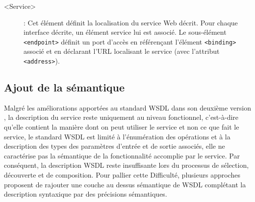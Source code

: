 \begin{description}
	    \item[<Service>]:
		Cet élément définit la localisation du service Web décrit. Pour chaque
		interface décrite, un élément service lui est associé. Le sous-élément \texttt{<endpoint>} définit un
		port d’accès en référençant l’élément \texttt{<binding>} associé et en déclarant l'\textsc{URL} 
		localisant le service (avec l’attribut \texttt{<address>}). 	    	



	\end{description}

        \subsection{Ajout de la sémantique}
	    Malgré les améliorations apportées au standard \textsc{WSDL} dans son deuxième version
	    \cite{chinnici2007web}, la description du service reste uniquement au niveau fonctionnel, 
	    c'est-à-dire qu'elle contient la manière dont on peut utiliser le service et non ce
	    que fait le service, le standard \textsc{WSDL} est limité à l'énumération des opérations et 
	    à la description des types des paramètres d'entrée et de sortie associés, elle ne caractérise 
	    pas la sémantique de la fonctionnalité accomplie par le service. Par conséquent, la description
	    \textsc{WSDL} reste insuffisante lors du processus de sélection, découverte et de composition. 
	    Pour pallier cette Difficulté, plusieurs approches proposent de rajouter 
	    une couche au dessus sémantique de \textsc{WSDL} complétant la description syntaxique par 
	    des précisions sémantiques.\\

